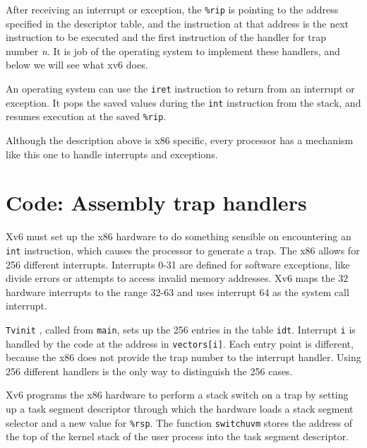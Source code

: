 After receiving an interrupt or exception,
the
\texttt{\%rip}
is pointing to the address specified in the descriptor table, and the
instruction at that address is the next instruction to be executed and
the first instruction of the handler for
trap number
\textit{n}.
It is job of the operating system to implement these handlers, and
below we will see what xv6 does.

An operating system can use the
\lstinline{iret}
instruction to return from an
interrupt or exception. It pops the saved values during the 
\lstinline{int}
instruction from the stack, and resumes execution at the saved
\texttt{\%rip}.

Although the description above is x86 specific, every processor has
a mechanism like this one to handle interrupts and exceptions.
\section{Code: Assembly trap handlers}

Xv6 must set up the x86 hardware to do something sensible
on encountering an
\lstinline{int}
instruction, which causes the processor to generate a trap.
The x86 allows for 256 different interrupts.
Interrupts 0-31 are defined for software
exceptions, like divide errors or attempts to access invalid memory addresses.
Xv6 maps the 32 hardware interrupts to the range 32-63
and uses interrupt 64 as the system call interrupt.

\lstinline{Tvinit}
,
called from
\lstinline{main},
sets up the 256 entries in the table
\lstinline{idt}.
Interrupt
\lstinline{i}
is handled by the
code at the address in
\lstinline{vectors[i]}.
Each entry point is different, because the x86
does not provide the trap number to the interrupt handler.
Using 256 different handlers is the only way to distinguish
the 256 cases.

Xv6 programs the x86 hardware to perform a stack switch on a trap by
setting up a task segment descriptor through which the hardware loads a stack
segment selector and a new value for
\texttt{\%rsp}.
The function
\lstinline{switchuvm}
stores the address of the top of the kernel stack of the user
process into the task segment descriptor.

